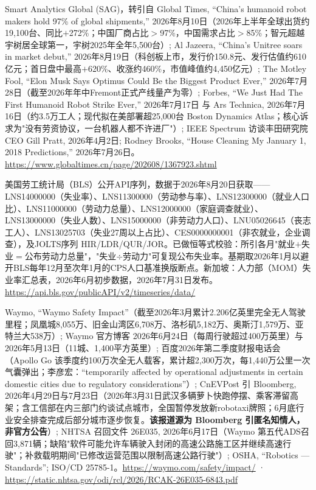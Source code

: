 \documentclass[11pt,a4paper]{ctexart}
\begin{document}
\noindent [127] Smart Analytics Global (SAG)，转引自 Global Times, ``China's humanoid robot makers hold 97\% of global shipments,'' 2026年8月10日（2026年上半年全球出货约19,100台、同比$+$272\%；中国厂商占比$>$97\%，中国需求占比$>$85\%；智元超越宇树居全球第一，宇树2025年全年5,500台）; Al Jazeera, ``China's Unitree soars in market debut,'' 2026年8月19日（科创板上市，发行价150.8元、发行估值约610亿元；首日盘中最高$+$620\%、收涨约460\%，市值峰值约4,450亿元）; The Motley Fool, ``Elon Musk Says Optimus Could Be the Biggest Product Ever,'' 2026年7月28日（截至2026年年中Fremont正式产线量产为零）; Forbes, ``We Just Had The First Humanoid Robot Strike Ever,'' 2026年7月17日 与 Ars Technica, 2026年7月16日（约3.5万工人；现代拟在美部署超25,000台 Boston Dynamics Atlas；核心诉求为"没有劳资协议，一台机器人都不许进厂"）; IEEE Spectrum 访谈丰田研究院CEO Gill Pratt, 2026年4月2日; Rodney Brooks, ``House Cleaning My January 1, 2018 Predictions,'' 2026年7月26日。\url{https://www.globaltimes.cn/page/202608/1367923.shtml}

\noindent [128] 美国劳工统计局（BLS）公开API序列，数据于2026年8月20日获取——LNS14000000（失业率）、LNS11300000（劳动参与率）、LNS12300000（就业人口比）、LNS11000000（劳动力总量）、LNS12000000（家庭调查就业）、LNS13000000（失业人数）、LNS15000000（非劳动力人口）、LNU05026645（丧志工人）、LNS13025703（失业27周以上占比）、CES0000000001（非农就业，企业调查），及JOLTS序列 HIR/LDR/QUR/JOR。已做恒等式校验：所引各月"就业$+$失业$=$公布劳动力总量"，"失业$\div$劳动力"可复现公布失业率。基期取2026年1月以避开BLS每年12月至次年1月的CPS人口基准换版断点。新加坡：人力部（MOM）失业率汇总表，2026年6月初步数据，2026年7月31日发布。\url{https://api.bls.gov/publicAPI/v2/timeseries/data/}

\noindent [129] Waymo, ``Waymo Safety Impact''（截至2026年3月累计2.206亿英里完全无人驾驶里程；凤凰城8,055万、旧金山湾区6,708万、洛杉矶5,182万、奥斯汀1,579万、亚特兰大538万）; Waymo 官方博客 2026年6月24日（每周行驶超过400万英里）与2026年5月13日（11城、1,400平方英里）; 百度2026年第二季度财报电话会（Apollo Go 该季度约100万次全无人载客，累计超2,300万次，每1,440万公里一次气囊弹出；李彦宏：``temporarily affected by operational adjustments in certain domestic cities due to regulatory considerations''）; CnEVPost 引 Bloomberg, 2026年4月29日与7月23日（2026年3月31日武汉多辆萝卜快跑停摆、乘客滞留高架；含工信部在内三部门约谈试点城市，全国暂停发放新robotaxi牌照；6月底行业安全排查完成后部分城市逐步恢复。\textbf{该报道源为 Bloomberg 引匿名知情人，非官方公告}）; NHTSA 召回文件 26E035, 2026年6月17日（Waymo 第五代ADS召回3,871辆；缺陷"软件可能允许车辆驶入封闭的高速公路施工区并继续高速行驶"；补救载明期间"已修改运营范围以限制高速公路行驶"）; OSHA, ``Robotics --- Standards''; ISO/CD 25785-1。\url{https://waymo.com/safety/impact/} · \url{https://static.nhtsa.gov/odi/rcl/2026/RCAK-26E035-6843.pdf}
\end{document}
